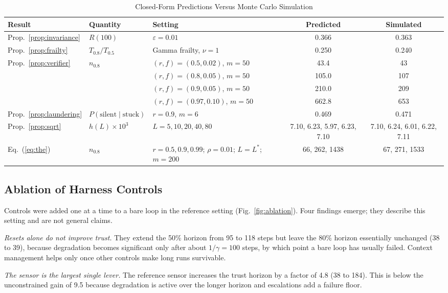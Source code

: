 \documentclass[journal]{IEEEtran}
\begin{document}
\begin{table}[!t]
\centering
\caption{Closed-Form Predictions Versus Monte Carlo Simulation}
\label{tab:validation}
\small
\setlength{\tabcolsep}{4.5pt}
\begin{tabular}{@{}lllcc@{}}
\toprule
Result & Quantity & Setting & Predicted & Simulated\\
\midrule
Prop.~\ref{prop:invariance} & $R(100)$ & $\varepsilon=0.01$ & 0.366 & 0.363\\
Prop.~\ref{prop:frailty} & $T_{0.8}/T_{0.5}$ & Gamma frailty, $\nu=1$ & 0.250 & 0.240\\
Prop.~\ref{prop:verifier} & $n_{0.8}$ & $(r,f)=(0.5,0.02)$, $m=50$ & 43.4 & 43\\
 & & $(r,f)=(0.8,0.05)$, $m=50$ & 105.0 & 107\\
 & & $(r,f)=(0.9,0.05)$, $m=50$ & 210.0 & 209\\
 & & $(r,f)=(0.97,0.10)$, $m=50$ & 662.8 & 653\\
Prop.~\ref{prop:laundering} & $P(\mathrm{silent}\mid\mathrm{stuck})$ & $r=0.9$, $m=6$ & 0.469 & 0.471\\
Prop.~\ref{prop:sqrt} & $h(L)\times10^3$ & $L=5,10,20,40,80$ & 7.10, 6.23, 5.97, 6.23, 7.10 & 7.10, 6.24, 6.01, 6.22, 7.11\\
Eq.~(\ref{eq:the}) & $n_{0.8}$ & $r=0.5,0.9,0.99$; $\rho=0.01$; $L=L^*$; $m=200$ & 66, 262, 1438 & 67, 271, 1533\\
\bottomrule
\end{tabular}
\end{table}

\subsection{Ablation of Harness Controls}\label{sec:ablation}
Controls were added one at a time to a bare loop in the reference setting (Fig.~\ref{fig:ablation}). Four findings emerge; they describe this setting and are not general claims.

\emph{Resets alone do not improve trust.} They extend the 50\% horizon from 95 to 118 steps but leave the 80\% horizon essentially unchanged (38 to 39), because degradation becomes significant only after about $1/\gamma=100$ steps, by which point a bare loop has usually failed. Context management helps only once other controls make long runs survivable.

\emph{The sensor is the largest single lever.} The reference sensor increases the trust horizon by a factor of 4.8 (38 to 184). This is below the unconstrained gain of 9.5 because degradation is active over the longer horizon and escalations add a failure floor.
\end{document}
